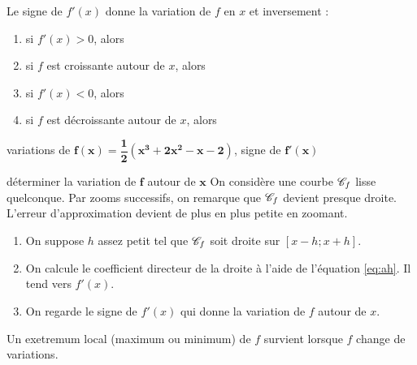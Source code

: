 
\begin{propriete}{}{}
	Le signe de $f'(x)$ donne la variation de $f$ en $x$ et inversement :
		\begin{enumerate}
			\item si $f'(x) > 0$, alors 
			\item si $f$ est croissante autour de $x$, alors
			\item si $f'(x) < 0$, alors 
			\item si $f$ est décroissante autour de $x$, alors
		\end{enumerate}
\end{propriete}

\begin{exemple*}{variations de $\mathbf{f(x) = \dfrac12(x^3 + 2x^2 - x - 2)}$, signe de $\mathbf{f'(x)}$}{}
	\begin{center}
	\end{center}
\end{exemple*}

\begin{strategie*}{déterminer la variation de $\mathbf{f}$ autour de $\mathbf{x}$}{}
	On considère une courbe $\mathcal{C}_f$ lisse quelconque.
	Par zooms successifs, on remarque que $\mathcal{C}_f$ devient presque droite.
	L'erreur d'approximation devient de plus en plus petite en zoomant.
	
	\begin{enumerate}
		\item On suppose $h$ assez petit tel que $\mathcal{C}_f$ soit droite sur $[x-h ; x+h]$.
		\item On calcule le coefficient directeur de la droite à l'aide de l'équation \eqref{eq:ah}. Il tend vers $f'(x)$.
		\item On regarde le signe de $f'(x)$ qui donne la variation de $f$ autour de $x$.
	\end{enumerate}
\end{strategie*}

\begin{rappel*}{}{}
	Un exetremum local (maximum ou minimum) de $f$ survient lorsque $f$ change de variations.
\end{rappel*}

